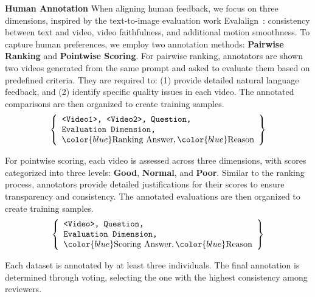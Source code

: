 \vspace{0.5\baselineskip}
\noindent\textbf{Human Annotation}  
When aligning human feedback, we focus on three dimensions, inspired by the text-to-image evaluation work Evalalign~\cite{tan2024evalalign}: consistency between text and video, video faithfulness, and additional motion smoothness. To capture human preferences, we employ two annotation methods: \textbf{Pairwise Ranking} and \textbf{Pointwise Scoring}. 
For pairwise ranking, annotators are shown two videos generated from the same prompt and asked to evaluate them based on predefined criteria. They are required to: (1) provide detailed natural language feedback, and (2) identify specific quality issues in each video. The annotated comparisons are then organized to create training samples.
{\small
\[
\left\{
\begin{array}{l}
    \texttt{<Video1>, <Video2>, Question,} \\
    \texttt{Evaluation Dimension,} \\
    {\color{blue} \text{Ranking~Answer}}, {\color{blue} \text{Reason}}
\end{array}
\right\}
\]
}

For pointwise scoring, each video is assessed across three dimensions, with scores categorized into three levels: \textbf{Good}, \textbf{Normal}, and \textbf{Poor}. Similar to the ranking process, annotators provide detailed justifications for their scores to ensure transparency and consistency. The annotated evaluations are then organized to create training samples.
{\small
\[
\left\{
\begin{array}{l}
    \texttt{<Video>, Question,} \\
    \texttt{Evaluation Dimension,} \\
    {\color{blue} \text{Scoring~Answer}}, {\color{blue} \text{Reason}}
\end{array}
\right\}
\]
}

Each dataset is annotated by at least three individuals. The final annotation is determined through voting, selecting the one with the highest consistency among reviewers.


